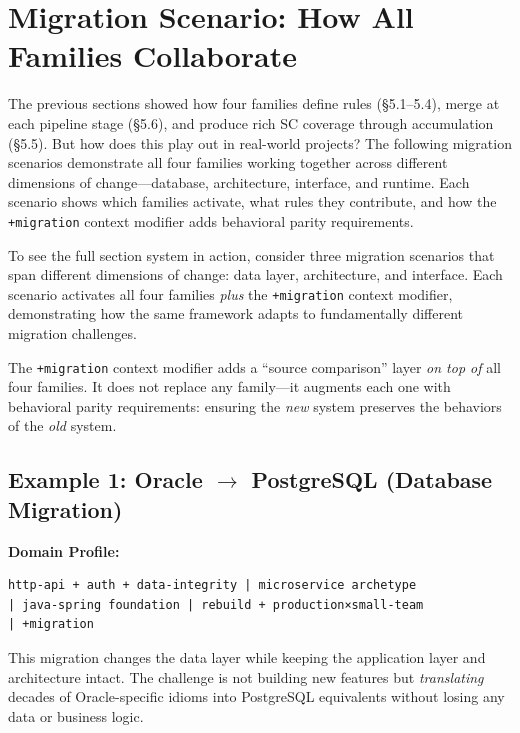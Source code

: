 \documentclass[11pt,a4paper,openright,twoside]{report}
\begin{document}
\section{Migration Scenario: How All Families Collaborate}
\label{sec:migration-scenario}

The previous sections showed how four families define rules (\S5.1--5.4), merge at each pipeline stage (\S5.6), and produce rich SC coverage through accumulation (\S5.5). But how does this play out in real-world projects? The following migration scenarios demonstrate all four families working together across different dimensions of change---database, architecture, interface, and runtime. Each scenario shows which families activate, what rules they contribute, and how the \texttt{+migration} context modifier adds behavioral parity requirements.

To see the full section system in action, consider three migration scenarios that span different dimensions of change: data layer, architecture, and interface. Each scenario activates all four families \emph{plus} the \texttt{+migration} context modifier, demonstrating how the same framework adapts to fundamentally different migration challenges.

The \texttt{+migration} context modifier adds a ``source comparison'' layer \emph{on top of} all four families. It does not replace any family---it augments each one with behavioral parity requirements: ensuring the \emph{new} system preserves the behaviors of the \emph{old} system.

\subsection{Example 1: Oracle $\to$ PostgreSQL (Database Migration)}

\textbf{Domain Profile:}
\begin{verbatim}
http-api + auth + data-integrity | microservice archetype
| java-spring foundation | rebuild + production×small-team
| +migration
\end{verbatim}

This migration changes the data layer while keeping the application layer and architecture intact. The challenge is not building new features but \emph{translating} decades of Oracle-specific idioms into PostgreSQL equivalents without losing any data or business logic.
\end{document}
